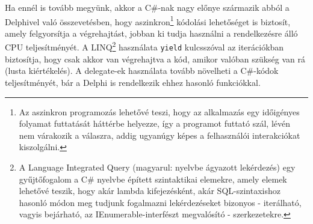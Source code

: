 \documentclass[tocnopagenum]{thesis-ekf}
\begin{document}
	Ha ennél is tovább megyünk, akkor a C\#-nak nagy előnye származik abból a Delphivel való összevetésben, hogy aszinkron\footnote{ Az aszinkron programozás lehetővé teszi, hogy az alkalmazás egy időigényes folyamat futtatását háttérbe helyezze, így a programot futtató szál, lévén nem várakozik a válaszra, addig ugyanúgy képes a felhasználói interakciókat kiszolgálni.} kódolási lehetőséget is biztosít, amely felgyorsítja a végrehajtást, jobban ki tudja használni a rendelkezésre álló CPU teljesítményét.\cite{async}
	A LINQ\footnote{A Language Integrated Query (magyarul: nyelvbe ágyazott lekérdezés) egy gyűjtőfogalom a C\# nyelvbe épített szintaktikai elemekre, amely elemek lehetővé teszik, hogy akár lambda kifejezésként, akár SQL-szintaxishoz hasonló módon meg tudjunk fogalmazni lekérdezéseket bizonyos - iterálható, vagyis bejárható, az IEnumerable-interfészt megvalósító - szerkezetekre.} használata \verb|yield| kulcsszóval az iterációkban biztosítja, hogy csak akkor van végrehajtva a kód, amikor valóban szükség van rá (lusta kiértékelés). A delegate-ek használata tovább növelheti a C\#-kódok teljesítményét, bár a Delphi is rendelkezik ehhez hasonló funkciókkal.
	\cite{perf_comp}
	
\end{document}
